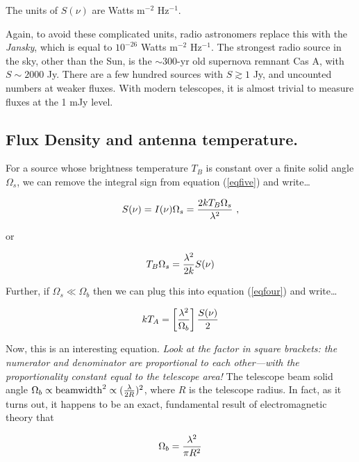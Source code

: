 \documentclass[psfig,preprint]{aastex}
\begin{document}
\noindent The units of $S(\nu)$ are Watts m$^{-2}$ Hz$^{-1}$.  

	Again, to avoid these complicated units, radio astronomers
replace this with the {\it Jansky}, which is equal to $10^{-26}$ Watts
m$^{-2}$ Hz$^{-1}$. The strongest radio source in the sky, other than
the Sun, is the $\sim 300$-yr old supernova remnant Cas A, with $S \sim
2000$ Jy. There are a few hundred sources with $S \gtrsim 1$ Jy, and
uncounted numbers at weaker fluxes. With modern telescopes, it is almost
trivial to measure fluxes at the 1 mJy level. 

	\subsection{Flux Density and antenna temperature.} 

	For a source whose brightness temperature $T_B$ is constant over
a finite solid angle $\Omega_s$, we can remove the integral sign from
equation (\ref{eqfive}) and write\dots

\begin{equation} S(\nu) = I(\nu) \Omega_s = {2 k T_B \Omega_s \over
\lambda^2} \ ,
\end{equation}

\noindent or

\begin{equation} T_B \Omega_s = {\lambda^2 \over 2k} S(\nu) 
\end{equation}

Further, if $\Omega_s \ll \Omega_b$ then we can plug this into equation
(\ref{eqfour}) and write\dots

\begin{equation} \label{nine}
k T_A = \left[ {\lambda^2 \over \Omega_b} \right] {S(\nu) \over 2} 
\end{equation}

	Now, this is an interesting equation.  {\it Look at the factor
in square brackets: the numerator and denominator are proportional to
each other---with the proportionality constant equal to the telescope
area!} The telescope beam solid angle $\Omega_b \propto {\rm
beamwidth}^2 \propto ({\lambda \over 2R})^2$, where $R$ is the telescope
radius.  In fact, as it turns out, it happens to be an exact,
fundamental result of electromagnetic theory that

\begin{equation} \Omega_b =  {\lambda^2 \over \pi R^2} 
\end{equation}
\end{document}
